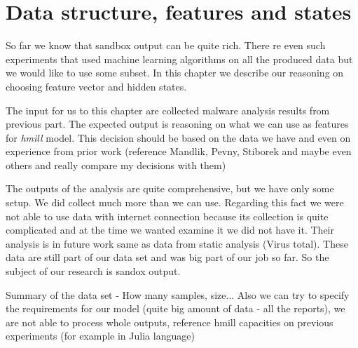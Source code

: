 \chapter{Data structure, features and states}
So far we know that sandbox output can be quite rich. There re even such experiments that used machine learning algorithms on all the produced data but we would like to use some subset. In this chapter we describe our reasoning on choosing feature vector and hidden states.

The input for us to this chapter are collected malware analysis results from previous part. The expected output is reasoning on what we can use as features for \emph{hmill} model. This decision should be based on the data we have and even on experience from prior work (reference Mandlik, Pevny, Stiborek and maybe even others and really compare my decisions with them)

The outputs of the analysis are quite comprehensive, but we have only some setup. We did collect much more than we can use. Regarding this fact we were not able to use data with internet connection because its collection is quite complicated and at the time we wanted examine it we did not have it. Their analysis is in future work same as data from static analysis (Virus total). These data are still part of our data set and was big part of our job so far. So the subject of our research is sandox output.

Summary of the data set - How many samples, size...
Also we can try to specify the requirements for our model (quite big amount of data - all the reports), we are not able to process whole outputs, reference hmill capacities on previous experiments (for example in Julia language)

